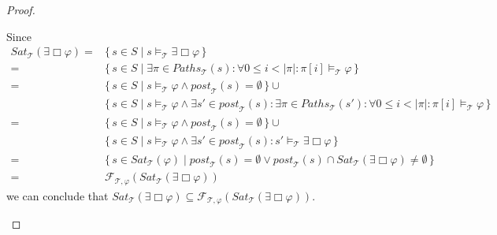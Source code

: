 \documentclass[12pt]{article}
\newcommand{\always}{\Box}
\theoremstyle{definition}
\begin{document}
\begin{proof}
\begin{itemize}
Since
\begin{align*}
\mathit{Sat}_{\mathcal{T}}(\exists \always \varphi)
= & \{\, s \in S \mid s \models_{\mathcal{T}} \exists \always \varphi \,\}\\
= & \{\, s \in S \mid \exists \pi \in \mathit{Paths}_{\mathcal{T}}(s) : \forall 0 \leq i < |\pi| : \pi[i] \models_{\mathcal{T}} \varphi \,\}\\
= & \{\, s \in S \mid s \models_{\mathcal{T}} \varphi \wedge \mathit{post}_{\mathcal{T}}(s) = \emptyset \,\} \cup\\
& \{\, s \in S \mid s \models_{\mathcal{T}} \varphi \wedge \exists s' \in \mathit{post}_{\mathcal{T}}(s) : \exists \pi \in \mathit{Paths}_{\mathcal{T}}(s') : \forall 0 \leq i < |\pi| : \pi[i] \models_{\mathcal{T}} \varphi \,\}\\
= & \{\, s \in S \mid s \models_{\mathcal{T}} \varphi \wedge \mathit{post}_{\mathcal{T}}(s) = \emptyset \,\} \cup\\
& \{\, s \in S \mid s \models_{\mathcal{T}} \varphi \wedge \exists s' \in \mathit{post}_{\mathcal{T}}(s) : s' \models_{\mathcal{T}} \exists \always \varphi \,\}\\
= & \{\, s \in \mathit{Sat}_{\mathcal{T}}(\varphi) \mid \mathit{post}_{\mathcal{T}}(s) = \emptyset \vee \mathit{post}_{\mathcal{T}}(s) \cap \mathit{Sat}_{\mathcal{T}}(\exists \always \varphi) \not= \emptyset \,\}\\
= & \mathcal{F}_{\mathcal{T}, \varphi}(\mathit{Sat}_{\mathcal{T}}(\exists \always \varphi))
\end{align*}
we can conclude that $\mathit{Sat}_{\mathcal{T}}(\exists \always \varphi) \subseteq \mathcal{F}_{\mathcal{T}, \varphi}(\mathit{Sat}_{\mathcal{T}}(\exists \always \varphi))$.


\end{itemize}
\end{proof}
\end{document}
